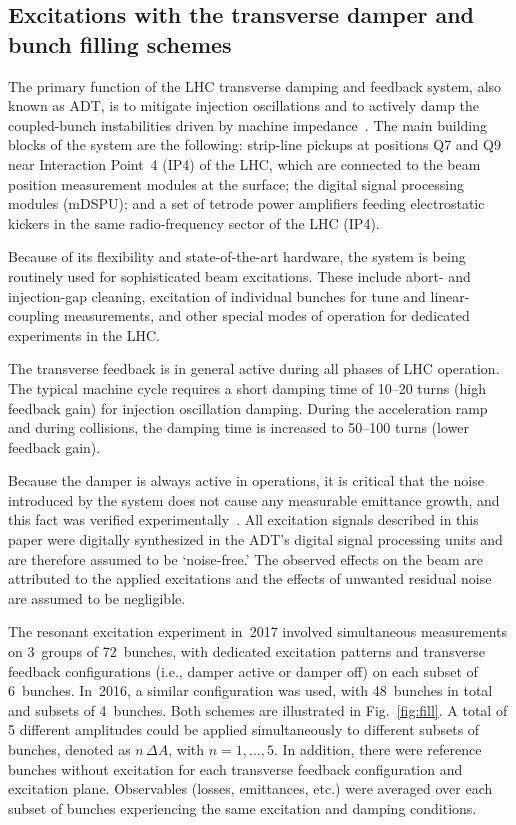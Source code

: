 \documentclass[aps
,prstab
,reprint
,longbibliography
,preprintnumbers
,showkeys
,amsfonts,amssymb,amsmath
,floatfix
]{revtex4-1}
\begin{document}
\subsection{Excitations with the transverse damper and bunch filling schemes}
\label{sec:adt}

The primary function of the LHC transverse damping and feedback
system, also known as ADT, is to mitigate injection oscillations and
to actively damp the coupled-bunch instabilities driven by machine
impedance~\cite{adt_sum_2008, adt_sum_2011}. The main building blocks
of the system are the following: strip-line pickups at positions Q7
and Q9 near Interaction Point~4 (IP4) of the LHC, which are connected
to the beam position measurement modules at the surface; the digital
signal processing modules (mDSPU); and a set of tetrode power
amplifiers feeding electrostatic kickers in the same radio-frequency
sector of the LHC (IP4).

Because of its flexibility and state-of-the-art hardware, the system
is being routinely used for sophisticated beam excitations. These
include abort- and injection-gap cleaning, excitation of individual
bunches for tune and linear-coupling measurements, and other special
modes of operation for dedicated experiments in the LHC.

The transverse feedback is in general active during all phases of LHC
operation. The typical machine cycle requires a short damping time of
10--20 turns (high feedback gain) for injection oscillation
damping. During the acceleration ramp and during collisions, the
damping time is increased to 50--100 turns (lower feedback gain).

Because the damper is always active in operations, it is critical that
the noise introduced by the system does not cause any measurable
emittance growth, and this fact was verified
experimentally~\cite{adt_noise_emit_2017}. All excitation signals
described in this paper were digitally synthesized in the ADT's
digital signal processing units and are therefore assumed to be
`noise-free.' The observed effects on the beam are attributed to the
applied excitations and the effects of unwanted residual noise are
assumed to be negligible.

The resonant excitation experiment in~2017 involved simultaneous
measurements on 3~groups of 72~bunches, with dedicated excitation
patterns and transverse feedback configurations (i.e., damper active
or damper off) on each subset of 6~bunches. In~2016, a similar
configuration was used, with 48~bunches in total and subsets of
4~bunches. Both schemes are illustrated in Fig.~\ref{fig:fill}. A
total of 5 different amplitudes could be applied simultaneously to
different subsets of bunches, denoted as $n \, \Delta A$, with
$n = 1, \ldots, 5$. In addition, there were reference bunches without
excitation for each transverse feedback configuration and excitation
plane. Observables (losses, emittances, etc.) were averaged over each
subset of bunches experiencing the same excitation and damping
conditions.
\end{document}
